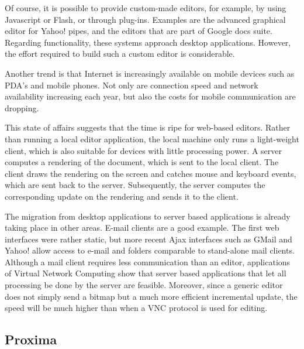 \documentclass[10pt]{article}
\begin{document}
Of course, it is possible to provide custom-made editors, for example, by using Javascript or Flash, or through plug-ins. Examples are the advanced graphical editor for Yahoo! pipes, and the editors that are part of Google docs suite. Regarding functionality, these systems approach desktop applications. However, the effort required to build such a custom editor is considerable.

Another trend is that Internet is increasingly available on mobile devices such as PDA's and mobile phones. Not only are connection speed and network availability increasing each year, but also the costs for mobile communication are dropping. 

This state of affairs suggests that the time is ripe for web-based editors. Rather than running a local editor application, the local machine only runs a light-weight client, which is also suitable for devices with little processing power. A server computes a rendering of the document, which is sent to the local client. The client draws the rendering on the screen and catches mouse and keyboard events, which are sent back to the server. Subsequently, the server computes the corresponding update on the rendering and sends it to the client.

The migration from desktop applications to server based applications is already taking place in other areas. E-mail clients are a good example. The first web interfaces were rather static, but more recent Ajax interfaces such as GMail and Yahoo! allow access to e-mail and folders comparable to stand-alone mail clients. Although a mail client requires less communication than an editor, applications of Virtual Network Computing show that server based applications that let all processing be done by the server are feasible. Moreover, since a generic editor does not simply send a bitmap but a much more efficient incremental update, the speed will be much higher than when a VNC protocol is used for editing. 


\subsection{Proxima}
\end{document}
